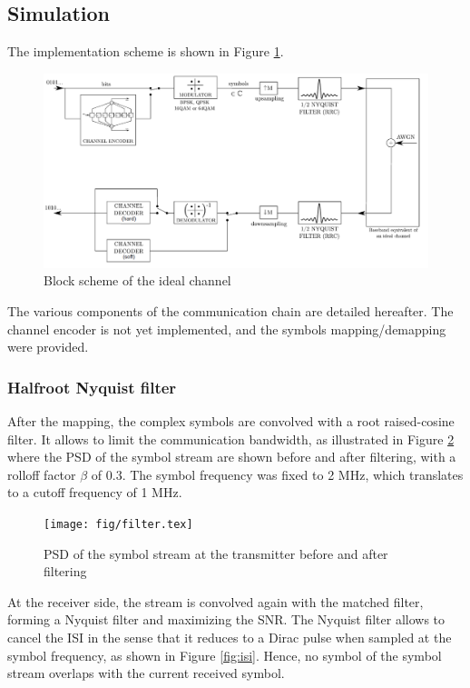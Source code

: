 \subsection{Simulation}

The implementation scheme is shown in Figure \ref{fig:block}.

\begin{figure}[H]
    \centering
    \includegraphics[width = .9\textwidth]{fig/block.png}
    \caption{Block scheme of the ideal channel}
    \label{fig:block}
\end{figure}

The various components of the communication chain are detailed hereafter. The channel encoder is not yet implemented, and the symbols mapping/demapping were provided.

\subsubsection{Halfroot Nyquist filter}

After the mapping, the complex symbols are convolved with a root raised-cosine filter. It allows to limit the communication bandwidth, as illustrated in Figure \ref{fig:filter} where the PSD of the symbol stream are shown before and after filtering, with a rolloff factor $\beta$ of $0.3$. The symbol frequency was fixed to 2 \si{\mega \hertz}, which translates to a cutoff frequency of 1 \si{\mega \hertz}.

\begin{figure}[H]
\centering
    \texttt{[image: fig/filter.tex]}
     \caption{PSD of the symbol stream at the transmitter before and after filtering}
    \label{fig:filter}
\end{figure}

At the receiver side, the stream is convolved again with the matched filter, forming a Nyquist filter and maximizing the SNR. The Nyquist filter allows to cancel the ISI in the sense that it reduces to a Dirac pulse when sampled at the symbol frequency, as shown in Figure \ref{fig:isi}. Hence, no symbol of the symbol stream overlaps with the current received symbol.

